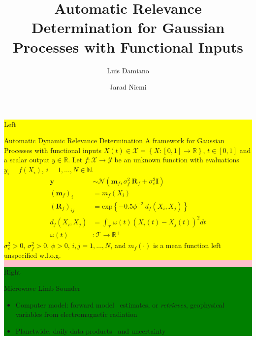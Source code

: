 \documentclass[final]{beamer}
\title{Automatic Relevance Determination
  for Gaussian Processes with Functional Inputs}
\author{
  Luis Damiano \inst{1} \and
  Jarad Niemi \inst{1}}
\institute[Iowa State]{
  \inst{1} Department of Statistics, Iowa State University}
\begin{document}
\begin{frame}[t]

  \colorbox{pink}{
    \begin{minipage}[t][76cm][t]{58cm}
      \colorbox{yellow}{
        \begin{minipage}[t][20cm][t]{28cm}
          Left
          \begin{block}{Automatic Dynamic Relevance Determination}
            A framework for Gaussian Processes with functional inputs
            $X(t)\in\mathcal{X} = \left\{X:[0,1]\to\mathbb{R}\right\}$, $t\in[0, 1]$
            and a scalar output $y\in\mathbb{R}$. Let $f:\mathcal{X}\to\mathcal{Y}$ be
            an unknown function with evaluations $y_i = f(X_i)$, $i = 1, \dots,
            N\in\mathbb{N}$.
            \begin{align}
              \mathbf{y}
              &\sim \mathcal{N}\left(\mathbf{m}_f, \sigma_{f}^{2} \ \mathbf{R}_f
                + \sigma_{\varepsilon}^{2}\mathbf{I}\right) \\
              (\mathbf{m}_f)_i
              &= m_f(X_i) \\
              {\left(\mathbf{R}_f\right)}_{ij}
              &=
                \text{exp}\left\{
                -0.5 \phi^{-2} \ d_f(X_i, X_j)
                \right\}
              \\
              d_f(X_i, X_j)
              &= \int_{\mathcal{T}}
                \omega(t)
                {\left(X_i(t) - X_j(t) \right)}^2 dt
              \\
              \omega(t)
              &: \mathcal{T}\to\mathbb{R}^+
            \end{align}
            $\sigma_{\varepsilon}^2 > 0$,
            $\sigma_{f}^2 > 0$,
            $\phi > 0$,
            $i, j = 1, \dots, N$,
            and $m_f(\cdot)$ is a mean function left unspecified w.l.o.g.
          \end{block}
        \end{minipage}
      }
      \colorbox{green}{
        \begin{minipage}[t][20cm][t]{28cm}
          Right
          \begin{block}{Microwave Limb Sounder}
            \begin{itemize}
            \item Computer model: forward
              model~\cite{read2006,schwartz2006,waters2006} estimates, or
              \emph{retrieves}, geophysical variables from electromagnetic radiation
            \item Planetwide, daily data products~\cite{liversey2020} and uncertainty

\end{itemize}
\end{block}
\end{minipage}}
\end{minipage}}
\end{frame}
\end{document}

